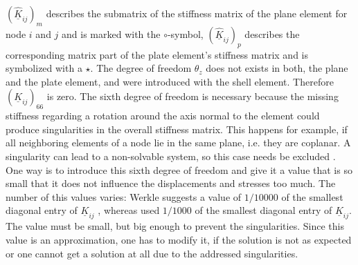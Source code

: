  $\left(\underline{\hat{K}}_{ij}\right)_m$ describes the submatrix of the stiffness matrix of the plane element for node $i$ and $j$ and is marked with the $\circ$-symbol, $\left(\underline{\hat{K}}_{ij}\right)_p$ describes the corresponding matrix part of the plate element's stiffness matrix and is symbolized with a $\star$.
 The degree of freedom $\theta_z$ does not exists in both, the plane and the plate element, and were introduced with the shell element. Therefore $(\underline{K}_{ij})_{66}$ is zero. The sixth degree of freedom is necessary because the missing stiffness regarding a rotation around the axis normal to the element could produce singularities in the overall stiffness matrix. This happens for example, if all neighboring elements of a node lie in the same plane, i.e. they are coplanar. A singularity can lead to a non-solvable system, so this case needs be excluded \cite{steinke2005finite}. One way is to introduce this sixth degree of freedom and give it a value that is so small that it does not influence the displacements and stresses too much. The number of this values varies: Werkle suggests a value of $1/10000$ of the smallest diagonal entry of $\underline{K}_{ij}$ \cite{werkle1995finite}, whereas \cite{kansara2004development} used $1/1000$ of the smallest diagonal entry of $\underline{K}_{ij}$. The value must be small, but big enough to prevent the singularities. Since this value is an approximation, one has to modify it, if the solution is not as expected or one cannot get a solution at all due to the addressed singularities.
 
